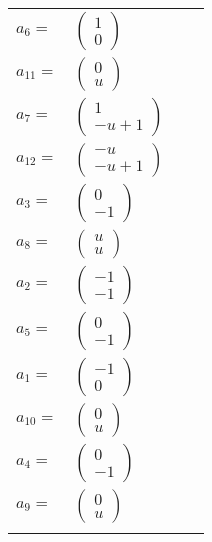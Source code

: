 \documentclass[1p]{elsarticle_modified}
\theoremstyle{definition}
\begin{document}
\begin{tabular}{m{7pt} m{180pt} m{7pt} m{180pt} }
\flushright $a_{6}=$&$\begin{pmatrix}1\\0\end{pmatrix}$ \\
\flushright $a_{11}=$&$\begin{pmatrix}0\\u\end{pmatrix}$ \\
\flushright $a_{7}=$&$\begin{pmatrix}1\\- u+1\end{pmatrix}$ \\
\flushright $a_{12}=$&$\begin{pmatrix}- u\\- u+1\end{pmatrix}$ \\
\flushright $a_{3}=$&$\begin{pmatrix}0\\-1\end{pmatrix}$ \\
\flushright $a_{8}=$&$\begin{pmatrix}u\\u\end{pmatrix}$ \\
\flushright $a_{2}=$&$\begin{pmatrix}-1\\-1\end{pmatrix}$ \\
\flushright $a_{5}=$&$\begin{pmatrix}0\\-1\end{pmatrix}$ \\
\flushright $a_{1}=$&$\begin{pmatrix}-1\\0\end{pmatrix}$ \\
\flushright $a_{10}=$&$\begin{pmatrix}0\\u\end{pmatrix}$ \\
\flushright $a_{4}=$&$\begin{pmatrix}0\\-1\end{pmatrix}$ \\
\flushright $a_{9}=$&$\begin{pmatrix}0\\u\end{pmatrix}$\\&\end{tabular}
\end{document}

